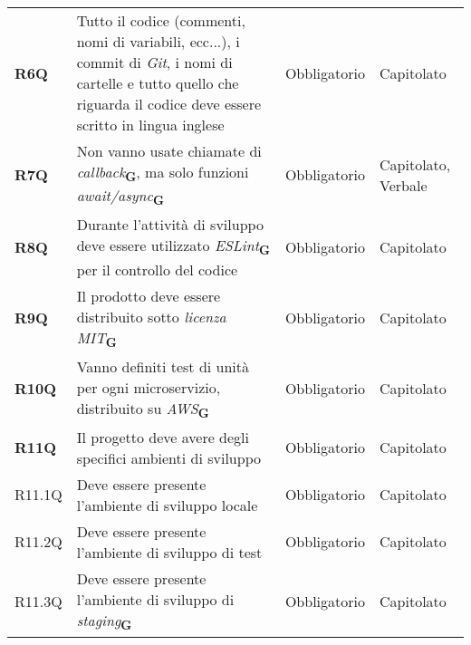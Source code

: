 \begin{center}
\begin{longtable}[!h]{p{50px} p{200px} p{100px} p{50px}}
        \textbf{R6Q}                          & Tutto il codice (commenti, nomi di variabili, ecc...), i commit di \textit{Git}, i nomi di cartelle e tutto quello che riguarda il codice deve essere scritto in lingua inglese & Obbligatorio             & Capitolato                   \\
        \textbf{R7Q}                          & Non vanno usate chiamate di \textit{callback}\textsubscript{\textbf{G}}, \newline ma solo funzioni \textit{await/async}\textsubscript{\textbf{G}}                               & Obbligatorio             & Capitolato, \newline Verbale \\
        \textbf{R8Q}                          & Durante l'attività di sviluppo deve essere utilizzato \textit{ESLint}\textsubscript{\textbf{G}} per il controllo del codice                                                     & Obbligatorio             & Capitolato                   \\
        \textbf{R9Q}                          & Il prodotto deve essere distribuito sotto \textit{licenza MIT}\textsubscript{\textbf{G}}                                                                                        & Obbligatorio             & Capitolato                   \\
        \textbf{R10Q}                         & Vanno definiti test di unità per ogni microservizio, distribuito su \textit{AWS}\textsubscript{\textbf{G}}                                                                      & Obbligatorio             & Capitolato                   \\
        \textbf{R11Q}                         & Il progetto deve avere degli specifici ambienti di sviluppo                                                                                                                     & Obbligatorio             & Capitolato                   \\
        R11.1Q                                & Deve essere presente l'ambiente di sviluppo locale                                                                                                                              & Obbligatorio             & Capitolato                   \\
        R11.2Q                                & Deve essere presente l'ambiente di sviluppo di test                                                                                                                             & Obbligatorio             & Capitolato                   \\
        R11.3Q                                & Deve essere presente l'ambiente di sviluppo di \textit{staging}\textsubscript{\textbf{G}}                                                                                       & Obbligatorio             & Capitolato                   \\
    \end{longtable}
\end{center}


